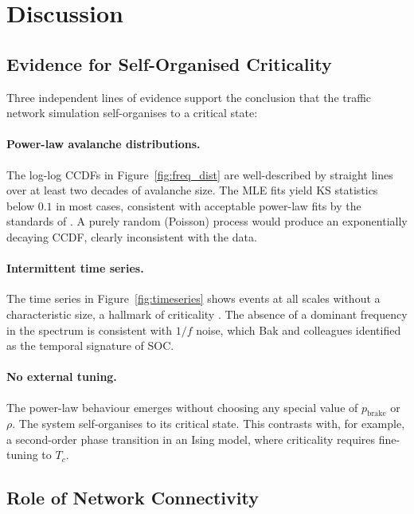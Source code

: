 \documentclass[12pt,a4paper]{article}
\begin{document}
\section{Discussion}
\label{sec:discussion}

\subsection{Evidence for Self-Organised Criticality}
\label{subsec:soc_evidence}

Three independent lines of evidence support the conclusion that the 
traffic network simulation self-organises to a critical state:

\paragraph{Power-law avalanche distributions.}
The log-log CCDFs in Figure~\ref{fig:freq_dist} are well-described 
by straight lines over at least two decades of avalanche size. 
The MLE fits yield KS statistics below $0.1$ in most cases, 
consistent with acceptable power-law fits by the standards of 
\citet{clauset2009}. A purely random (Poisson) process would produce 
an exponentially decaying CCDF, clearly inconsistent with the data.

\paragraph{Intermittent time series.}
The time series in Figure~\ref{fig:timeseries} shows events at all 
scales without a characteristic size, a hallmark of criticality 
\citep{bak1996}. The absence of a dominant frequency in the spectrum 
is consistent with $1/f$ noise, which Bak and colleagues identified 
as the temporal signature of SOC.

\paragraph{No external tuning.}
The power-law behaviour emerges without choosing any special value 
of $p_\text{brake}$ or $\rho$. The system self-organises to its 
critical state. This contrasts with, for example, a second-order 
phase transition in an Ising model, where criticality requires 
fine-tuning to $T_c$.

\subsection{Role of Network Connectivity}
\label{subsec:conn_role}
\end{document}

